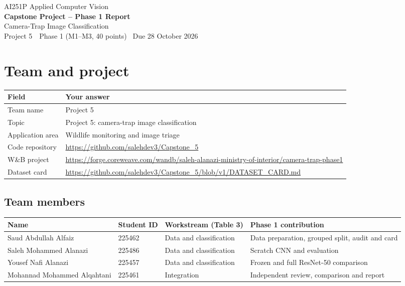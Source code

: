 \documentclass[11pt,a4paper]{article}
\newcommand{\teamname}{Project 5}
\newcommand{\projecttitle}{Camera-Trap Image Classification}
\begin{document}
\begin{center}
  {\large AI251P Applied Computer Vision}\\[4pt]
  {\LARGE\bfseries Capstone Project -- Phase 1 Report}\\[6pt]
  {\Large \projecttitle}\\[4pt]
  \teamname\ \textperiodcentered\ Phase 1 (M1--M3, 40 points) \textperiodcentered\ Due 28 October 2026
\end{center}
\vspace{4pt}

\section{Team and project}

\begin{tabularx}{\linewidth}{@{}l Y@{}}
\toprule
Field & Your answer \\
\midrule
Team name & Project 5 \\
Topic & Project 5: camera-trap image classification \\
Application area & Wildlife monitoring and image triage \\
Code repository & \url{https://github.com/salehdev3/Capstone_5} \\
W\&B project & \url{https://forge.coreweave.com/wandb/saleh-alanazi-ministry-of-interior/camera-trap-phase1} \\
Dataset card & \url{https://github.com/salehdev3/Capstone_5/blob/v1/DATASET_CARD.md} \\
\bottomrule
\end{tabularx}

\subsection*{Team members}

\begin{tabularx}{\linewidth}{@{}l l l Y@{}}
\toprule
Name & Student ID & Workstream (Table 3) & Phase 1 contribution \\
\midrule
Saud Abdullah Alfaiz & 225462 & Data and classification & Data preparation, grouped split, audit and card \\
Saleh Mohammed Alanazi & 225486 & Data and classification & Scratch CNN and evaluation \\
Yousef Nafi Alanazi & 225457 & Data and classification & Frozen and full ResNet-50 comparison \\
Mohannad Mohammed Alqahtani & 225461 & Integration & Independent review, comparison and report \\
\bottomrule
\end{tabularx}
\end{document}
